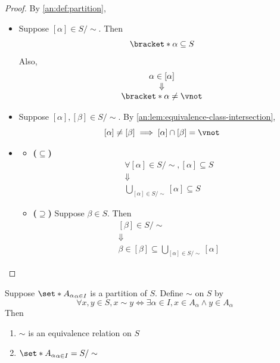 \begin{proof}
  By \cref{an:def:partition},
  \begin{itemize}
    \item Suppose $[\alpha] \in S / \sim$. Then
          \[
            \bracket*{\alpha} \subseteq S
          \]
          Also,
          \[
            \begin{array}{c}
              \alpha \in [\alpha] \\
              \Downarrow          \\
              \bracket*{\alpha} \neq \vnot
            \end{array}
          \]
    \item Suppose $[\alpha], [\beta] \in S / \sim$. By \cref{an:lem:equivalence-class-intersection},
          \[
            [\alpha] \neq [\beta] \implies [\alpha] \cap [\beta] = \vnot
          \]
    \item \begin{itemize}
            \item \textbf{($\subseteq$)}
                  \[
                    \begin{array}{c}
                      \forall [\alpha] \in S / \sim, [\alpha] \subseteq S \\
                      \Downarrow                                          \\
                      \bigcup_{[\alpha] \in S / \sim} [\alpha] \subseteq S
                    \end{array}
                  \]
            \item \textbf{($\supseteq$)} Suppose $\beta \in S$. Then
                  \[
                    \begin{array}{c}
                      [\beta] \in S / \sim \\
                      \Downarrow           \\
                      \beta \in [\beta]
                      \subseteq \displaystyle\bigcup_{[\alpha] \in S / \sim} [\alpha]
                    \end{array}
                  \]
          \end{itemize}
  \end{itemize}
\end{proof}

\bigskip

\begin{theorem} \label{an:thm:partition-defines-equivalence-relation}
  Suppose $\set*{A_{\alpha}}_{\alpha \in I}$ is a partition of $S$. Define $\sim$ on $S$ by
  \[
    \forall x, y \in S, x \sim y \iff \exists \alpha \in I, x \in A_{\alpha} \land y \in A_{\alpha}
  \]
  Then
  \begin{enumerate}[label=\textbf{(\Alph*)}]
    \item $\sim$ is an equivalence relation on $S$
    \item $\set*{A_{\alpha}}_{\alpha \in I} = S / \sim$
  \end{enumerate}
\end{theorem}


